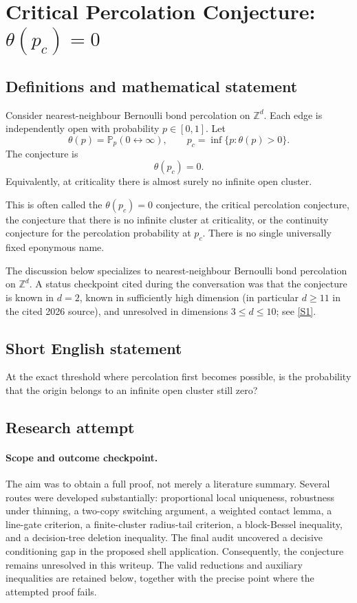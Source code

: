 \documentclass[11pt]{article}
\begin{document}
\section*{\texorpdfstring{Critical Percolation Conjecture: \(\theta(p_c)=0\)}{Critical Percolation Conjecture: theta(pc)=0}}\label{critical-percolation}

\subsection{Definitions and mathematical statement}
Consider nearest-neighbour Bernoulli bond percolation on \(\mathbb Z^d\). Each edge is independently open with probability \(p\in[0,1]\). Let
\[
\theta(p)=\mathbb P_p(0\leftrightarrow\infty),
\qquad
p_c=\inf\{p:\theta(p)>0\}.
\]
The conjecture is
\[
\boxed{\theta(p_c)=0.}
\]
Equivalently, at criticality there is almost surely no infinite open cluster.

This is often called the \(\theta(p_c)=0\) conjecture, the critical percolation conjecture, the conjecture that there is no infinite cluster at criticality, or the continuity conjecture for the percolation probability at \(p_c\). There is no single universally fixed eponymous name.

The discussion below specializes to nearest-neighbour Bernoulli bond percolation on \(\mathbb Z^d\). A status checkpoint cited during the conversation was that the conjecture is known in \(d=2\), known in sufficiently high dimension (in particular \(d\ge 11\) in the cited 2026 source), and unresolved in dimensions \(3\le d\le10\); see \href{https://arxiv.org/html/2608.23661v1}{[S1]}.

\subsection{Short English statement}
At the exact threshold where percolation first becomes possible, is the probability that the origin belongs to an infinite open cluster still zero?

\subsection{Research attempt}

\paragraph{Scope and outcome checkpoint.}
The aim was to obtain a full proof, not merely a literature summary. Several routes were developed substantially: proportional local uniqueness, robustness under thinning, a two-copy switching argument, a weighted contact lemma, a line-gate criterion, a finite-cluster radius-tail criterion, a block-Bessel inequality, and a decision-tree deletion inequality. The final audit uncovered a decisive conditioning gap in the proposed shell application. Consequently, the conjecture remains unresolved in this writeup. The valid reductions and auxiliary inequalities are retained below, together with the precise point where the attempted proof fails.
\end{document}
